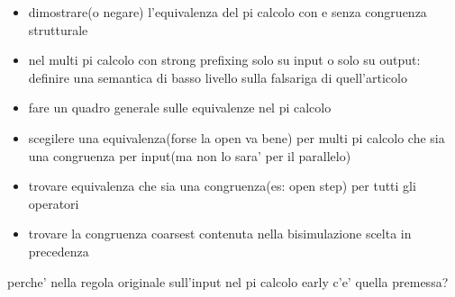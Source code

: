 




\begin{itemize}
  \item
    dimostrare(o negare) l'equivalenza del pi calcolo con e senza congruenza strutturale
  \item
    nel multi pi calcolo con strong prefixing solo su input o solo su output: definire una semantica di basso livello sulla falsariga di quell'articolo
  \item
    fare un quadro generale sulle equivalenze nel pi calcolo
  \item
    scegilere una equivalenza(forse la open va bene) per multi pi calcolo che sia una congruenza per input(ma non lo sara' per il parallelo)
  \item
    trovare equivalenza che sia una congruenza(es: open step) per tutti gli operatori
  \item
    trovare la congruenza coarsest contenuta nella bisimulazione scelta in precedenza
\end{itemize}

perche' nella regola originale sull'input nel pi calcolo early c'e' quella premessa?


